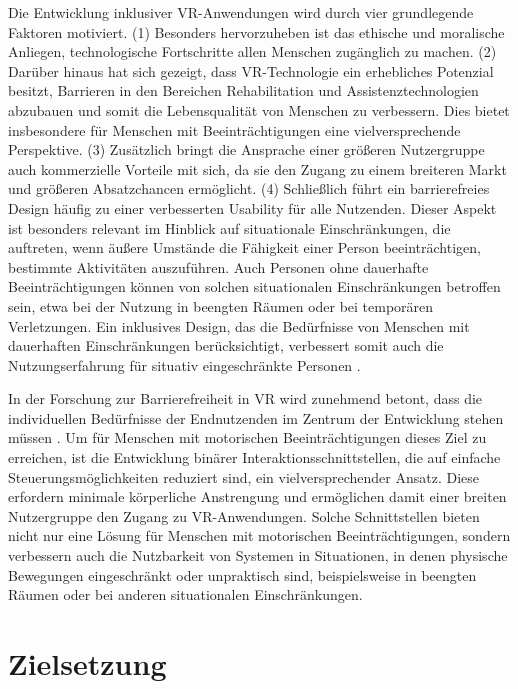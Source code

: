 Die Entwicklung inklusiver VR-Anwendungen wird durch vier grundlegende Faktoren motiviert. (1) Besonders hervorzuheben ist das ethische und moralische Anliegen, technologische Fortschritte allen Menschen zugänglich zu machen. (2) Darüber hinaus hat sich gezeigt, dass VR-Technologie ein erhebliches Potenzial besitzt, Barrieren in den Bereichen Rehabilitation und Assistenztechnologien abzubauen und somit die Lebensqualität von Menschen zu verbessern. Dies bietet insbesondere für Menschen mit Beeinträchtigungen eine vielversprechende Perspektive. (3) Zusätzlich bringt die Ansprache einer größeren Nutzergruppe auch kommerzielle Vorteile mit sich, da sie den Zugang zu einem breiteren Markt und größeren Absatzchancen ermöglicht. (4) Schließlich führt ein barrierefreies Design häufig zu einer verbesserten Usability für alle Nutzenden. Dieser Aspekt ist besonders relevant im Hinblick auf situationale Einschränkungen, die auftreten, wenn äußere Umstände die Fähigkeit einer Person beeinträchtigen, bestimmte Aktivitäten auszuführen. Auch Personen ohne dauerhafte Beeinträchtigungen können von solchen situationalen Einschränkungen betroffen sein, etwa bei der Nutzung in beengten Räumen oder bei temporären Verletzungen. Ein inklusives Design, das die Bedürfnisse von Menschen mit dauerhaften Einschränkungen berücksichtigt, verbessert somit auch die Nutzungserfahrung für situativ eingeschränkte Personen \citep{dudley_inclusive_2023}.

In der Forschung zur Barrierefreiheit in VR wird zunehmend betont, dass die individuellen Bedürfnisse der Endnutzenden im Zentrum der Entwicklung stehen müssen \citep{dombrowski_designing_2019}. Um für Menschen mit motorischen Beeinträchtigungen dieses Ziel zu erreichen, ist die Entwicklung binärer Interaktionsschnittstellen, die auf einfache Steuerungsmöglichkeiten reduziert sind, ein vielversprechender Ansatz.
Diese erfordern minimale körperliche Anstrengung und ermöglichen damit einer breiten Nutzergruppe den Zugang zu VR-Anwendungen. Solche Schnittstellen bieten nicht nur eine Lösung für Menschen mit motorischen Beeinträchtigungen, sondern verbessern auch die Nutzbarkeit von Systemen in Situationen, in denen physische Bewegungen eingeschränkt oder unpraktisch sind, beispielsweise in beengten Räumen oder bei anderen situationalen Einschränkungen.

\section{Zielsetzung}

